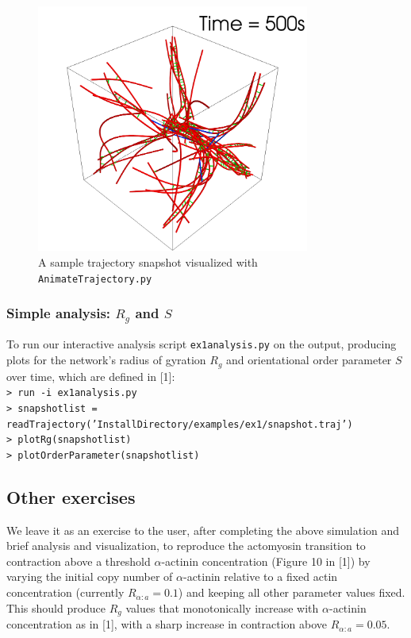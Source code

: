 \documentclass[11pt, oneside]{article}   	%
\begin{document}
\begin{figure}[h]
\caption{A sample trajectory snapshot visualized with \texttt{AnimateTrajectory.py}}
\centering
\includegraphics[width=0.8\textwidth]{SampleTraj}
\end{figure}

\subsubsection{Simple analysis: $R_g$ and $S$}

To run our interactive analysis script \texttt{ex1analysis.py} on the output, producing plots for the network's radius of gyration $R_g$ and orientational order parameter $S$ over time, which are defined in [1]:\\

\indent \texttt{> run -i ex1analysis.py}\\
\indent \texttt{> snapshotlist = readTrajectory('InstallDirectory/examples/ex1/snapshot.traj')}\\
\indent \texttt{> plotRg(snapshotlist)}\\
\indent \texttt{> plotOrderParameter(snapshotlist)}\\

\subsection{Other exercises}

We leave it as an exercise to the user, after completing the above simulation and brief analysis and visualization, to reproduce the actomyosin transition to contraction above a threshold $\alpha$-actinin concentration (Figure 10 in [1]) by varying the initial copy number of $\alpha$-actinin relative to a fixed actin concentration (currently $R_{\alpha:a}=0.1$) and keeping all other parameter values fixed. This should produce $R_g$ values that monotonically increase with $\alpha$-actinin concentration as in [1], with a sharp increase in contraction above $R_{\alpha:a}=0.05$.
\end{document}

